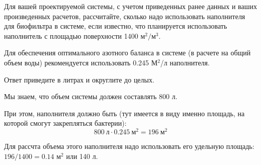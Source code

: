 
Для вашей проектируемой системы, с учетом приведенных ранее данных и ваших произведенных расчетов,  
рассчитайте, сколько надо использовать наполнителя для биофильтра в системе, если известно, что 
планируется использовать наполнитель с площадью поверхности 1400 $\text{м}^2/\text{м}^3$.

Для обеспечения оптимального азотного баланса в системе (в расчете на общий объем воды) 
рекомендуется использовать 0.245 М$^2$/л наполнителя.

Ответ приведите в литрах и округлите до целых.


\solutionSection

Мы знаем, что объем системы должен составлять 800 л.

При этом, наполнителя должно быть (тут имеется в виду именно площадь, на которой смогут закрепляться бактерии): 
$$800 \: \text{л} \cdot 0.245 \: \text{м}^2 = 196 \: \text{м}^2$$  

Для рассчта объема этого наполнителя надо использовать его удельную площадь: $196/1400 = 0.14$ м$^2$ или 140 л.

